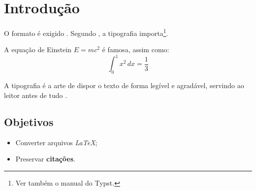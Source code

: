 \chapter{Introdução}
O formato  é exigido \cite[p.~42]{silva2020}. Segundo , a tipografia importa\footnote{Ver também o manual do Typst.}.

A equação de Einstein $E = mc^2$ é famosa, assim como:
\begin{equation}
\int_0^1 x^2 \, dx = \frac{1}{3}
\end{equation}

\begin{citacao}
A tipografia é a arte de dispor o texto de forma legível e agradável, servindo ao leitor antes de tudo \cite[p.~10]{souza2019}.
\end{citacao}

\section{Objetivos}
\begin{itemize}
  \item Converter arquivos \textit{LaTeX};
  \item Preservar \textbf{citações}.
\end{itemize}
